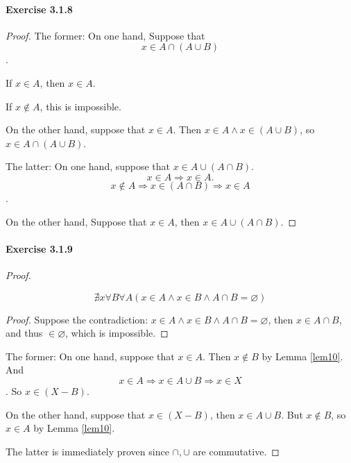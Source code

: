 \paragraph{Exercise 3.1.8} \label{exercise3.1.8}
\begin{proof}
The former: On one hand, 
Suppose that 
\[
x \in A \cap (A \cup B)
\].

If $x \in A$, then $x \in A$.

If $x \notin A$, this is impossible.

On the other hand, suppose that $x \in A$.
Then $x \in A \wedge x \in (A \cup B)$, so $x \in A \cap (A \cup B)$.

The latter: On one hand, suppose that $x \in A \cup (A \cap B)$.
\[
x \in A \Longrightarrow x \in A.
\]
\[
x \notin A \Longrightarrow x \in (A \cap B) \Longrightarrow x \in A
\].

On the other hand, Suppose that $x \in A$, then $x \in A \cup (A \cap B)$.
\end{proof}

\paragraph{Exercise 3.1.9} \label{exercise3.1.9}
\begin{proof}
\begin{lem} \label{lem10}
\[
\nexists x\forall B\forall A(x \in A \wedge x \in B \wedge A \cap B = \varnothing)
\]
\end{lem}
\begin{proof}
Suppose the contradiction: $x \in A \wedge x \in B \wedge A \cap B = \varnothing$, then 
$x \in A \cap B$, and thus $\in \varnothing$, which is impossible.
\end{proof}

The former: On one hand, suppose that $x \in A$. Then $x \notin B$ by Lemma \ref{lem10}. And
\[
x \in A \Longrightarrow x \in A \cup B \Longrightarrow x \in X
\].
So $x \in (X-B)$.

On the other hand, suppose that $x \in (X-B)$, then $x \in A \cup B$. But $x \notin B$, so $x \in A$ by 
Lemma \ref{lem10}.

The latter is immediately proven since $\cap,\cup$ are commutative.
\end{proof}

